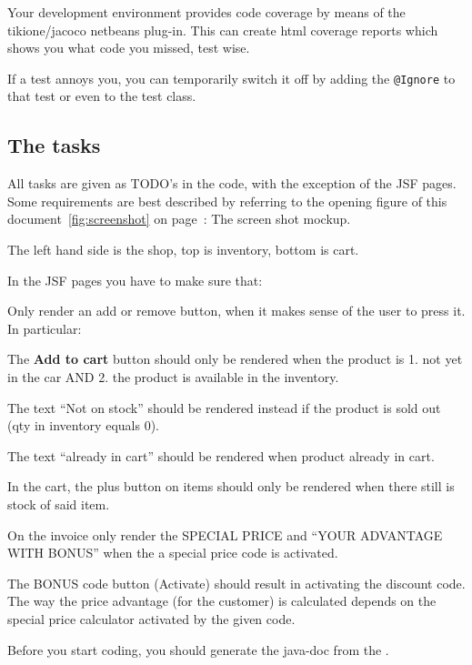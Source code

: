 Your development environment provides code coverage by means of the
tikione/jacoco netbeans plug-in. This can create html coverage reports
which shows you what code you missed, test wise.

If a test annoys you, you can temporarily switch it off by adding the
\lstinline{@Ignore} to that test or even to the test class.

\subsection{The tasks}

All tasks are given as TODO's in the code, with the exception of the
JSF pages. Some requirements are best described by referring to the
opening figure of this document~\ref{fig:screenshot} on
page~\pageref{fig:screenshot}: The screen shot mockup.

The left hand side is the shop, top is inventory, bottom is cart.

In the JSF pages you have to make sure that:
\begin{itemize*}
\item Only render an add or remove button, when it makes sense of the
  user to press it. In particular:
  \begin{itemize*}
  \item The \textbf{Add to cart} button should only be rendered when the product
    is 1. not yet in the car AND 2. the product is available in the inventory.
  \item The text ``Not on stock'' should be rendered instead if the
    product is sold out (qty in  inventory equals 0).
  \item The text ``already in cart'' should be rendered when product
    already in cart.
  \item In the cart, the plus button on items should only be rendered
    when there still is stock of said item.
  \end{itemize*}
\item On the invoice only render the SPECIAL PRICE and ``YOUR
  ADVANTAGE WITH BONUS'' when the a special price code is activated.
\item The BONUS code button (Activate) should result in activating
  the discount code. The way the price advantage (for the customer) is
  calculated depends on the special price calculator activated by the
  given code.
\end{itemize*}

Before you start coding, you should generate the java-doc from the
.
